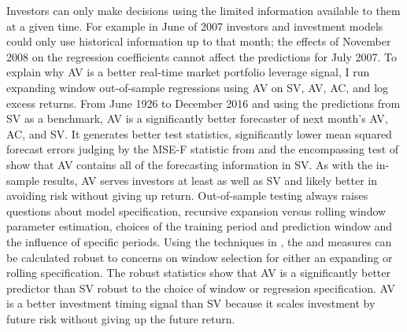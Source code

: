 Investors can only make decisions using the limited information available to them at a given time. For example in June of 2007 investors and investment models could only use historical information up to that month; the effects of November 2008 on the regression coefficients cannot affect the predictions for July 2007. %
To explain why AV is a better real-time market portfolio leverage signal, I run expanding window out-of-sample regressions using AV on SV, AV, AC, and log excess returns. From June 1926 to December 2016 and using the predictions from SV as a benchmark, AV is a significantly better forecaster of next month’s AV, AC, and SV. It generates better \citet{Diebold1995} test statistics, significantly lower mean squared forecast errors judging by the MSE-F statistic from \citet{mccracken_asymptotics_2007} and the encompassing test of \citet{harvey_tests_1998} show that AV contains all of the forecasting information in SV. As with the in-sample results, AV serves investors at least as well as SV and likely better in avoiding risk without giving up return. Out-of-sample testing always raises questions about model specification, recursive expansion versus rolling window parameter estimation, choices of the training period and prediction window and the influence of specific periods. Using the techniques in \citet{rossi_out--sample_2012}, the \citet{Diebold1995} and \citet{harvey_tests_1998} measures can be calculated robust to concerns on window selection for either an expanding or rolling specification.
The \citet{rossi_out--sample_2012}  robust statistics show that AV is a significantly better predictor than SV robust to the choice of window or regression specification. %
AV is a better investment timing signal than SV because it scales investment by future risk without giving up the future return.

